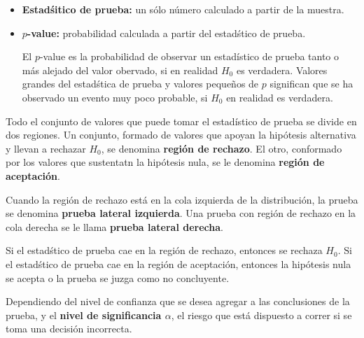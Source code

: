 \begin{itemize}
\item \textbf{Estad\'sitico de prueba:} un s\'olo n\'umero calculado a partir de la muestra.

\item \textbf{$p$-value:} probabilidad calculada a partir del estad\'stico de prueba.
\begin{Def}
El $p$-value es la probabilidad de observar un estad\'istico de prueba tanto o m\'as alejado del valor obervado, si en realidad $H_{0}$ es verdadera.\medskip
Valores grandes del estad\'stica de prueba  y valores peque\~nos de $p$ significan que se ha observado un evento muy poco probable, si $H_{0}$ en realidad es verdadera.
\end{Def}

\end{itemize}








Todo el conjunto de valores que puede tomar el estad\'istico de prueba se divide en dos regiones. Un conjunto, formado de valores que apoyan la hip\'otesis alternativa y llevan a rechazar $H_{0}$, se denomina \textbf{regi\'on de rechazo}. El otro, conformado por los valores que sustentatn la hip\'otesis nula, se le denomina \textbf{regi\'on de aceptaci\'on}.\medskip

Cuando la regi\'on de rechazo est\'a en la cola izquierda de la distribuci\'on, la  prueba se denomina \textbf{prueba lateral izquierda}. Una prueba con regi\'on de rechazo en la cola derecha se le llama \textbf{prueba lateral derecha}.



Si el estad\'stico de prueba cae en la regi\'on de rechazo, entonces se rechaza $H_{0}$. Si el estad\'stico de prueba cae en la regi\'on de aceptaci\'on, entonces la hip\'otesis nula se acepta o la prueba se juzga como no concluyente.\medskip








Dependiendo del nivel de confianza que se desea agregar a las conclusiones de la prueba, y el \textbf{nivel de significancia $\alpha$}, el riesgo que est\'a dispuesto a correr si se toma una decisi\'on incorrecta.








